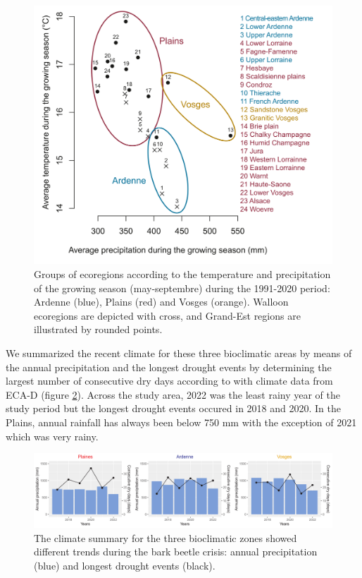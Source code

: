 \documentclass[3p,procedia]{elsarticle}
\begin{document}
\begin{figure}[htbp] 
	\centering
	\includegraphics[width=0.8\linewidth]{climat/climat_region.png}
	\caption{Groups of ecoregions according to the temperature and precipitation of the growing season (may-septembre) during the 1991-2020 period: Ardenne (blue), Plains (red) and Vosges (orange). Walloon ecoregions are depicted with cross, and Grand-Est regions are illustrated by rounded points.}
	\label{fig:clim}
\end{figure}

We summarized the recent climate for these three bioclimatic areas by means of the annual precipitation and the longest drought events by determining the largest number of consecutive dry days according to \cite{schulzweida_2015}  with climate data from ECA-D \citep{ecad} (figure \ref{fig:climECAD}).
Across the study area, 2022 was the least rainy year of the study period but the longest drought events occured in 2018 and 2020.
In the Plains, annual rainfall has always been below 750 mm with the exception of 2021 which was very rainy.


\begin{figure}[htbp] 
	\centering
	\includegraphics[width=0.8\linewidth]{Sec_pluvio.png}
	\caption{The climate summary for the three bioclimatic zones showed different trends during the bark beetle crisis: annual precipitation (blue) and longest drought events (black).}
	\label{fig:climECAD}
\end{figure}
\end{document}
